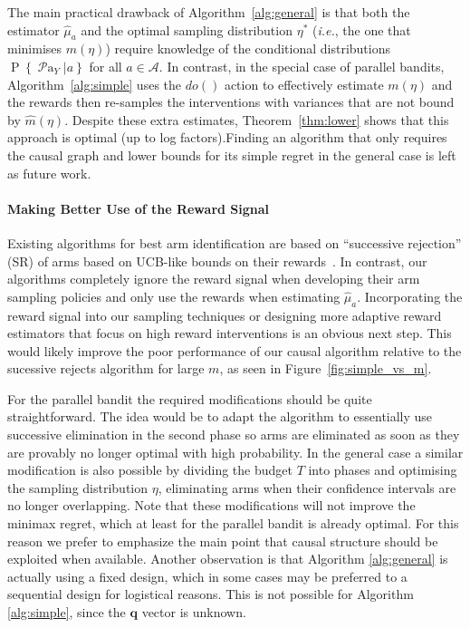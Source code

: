 \documentclass[11pt,a4paper,oneside]{book}
\newcommand{\Pn}[2]{\operatorname{P}\left\{#2|#1\right\}}
\newcommand{\calA}{\mathcal A}
\newcommand{\ie}{\textit{i.e.}}
\newcommand{\parents}[1]{\operatorname{\mathcal{P}a}_{#1}}
\renewcommand{\vec}[1]{\boldsymbol{#1}}
\begin{document}
The main practical drawback of Algorithm~\ref{alg:general} is that both the estimator $\hat{\mu}_a$ and the optimal sampling distribution $\eta^*$ (\ie, the one that minimises $m(\eta)$) require knowledge of the conditional distributions $\Pn{a}{\parents{Y}}$ for all $a \in \calA$. In contrast, in the special case of parallel bandits, Algorithm~\ref{alg:simple} uses the $do()$ action to effectively estimate $m(\eta)$ and the rewards then re-samples the interventions with variances that are not bound by $\hat{m}(\eta)$.
Despite these extra estimates, Theorem~\ref{thm:lower} shows that this approach is optimal (up to log factors).Finding an algorithm that only requires the causal graph and lower bounds for its simple regret in the general case is left as future work.


\paragraph{Making Better Use of the Reward Signal}
Existing algorithms for best arm identification are based on ``successive rejection'' (SR) of arms based on UCB-like bounds on their rewards~\citep{Even-Dar2002}. In contrast, our algorithms completely ignore the reward signal when developing their arm sampling policies and only use the rewards when estimating $\hat{\mu}_a$. Incorporating the reward signal into our sampling techniques or designing more adaptive reward estimators that focus on high reward interventions is an obvious next step. This would likely improve the poor performance of our causal algorithm relative to the sucessive rejects algorithm for large $m$, as seen in Figure~\ref{fig:simple_vs_m}.

For the parallel bandit the required modifications should be quite straightforward. The idea would be to adapt the algorithm to essentially use successive elimination in the second phase so arms are eliminated as soon as they are provably no longer optimal with high probability. In the general case a similar modification is also possible by dividing the budget $T$ into phases and optimising the sampling distribution $\eta$, eliminating arms when their confidence intervals are no longer overlapping. Note that these modifications will not improve the minimax regret, which at least for the parallel bandit is already optimal. For this reason we prefer to emphasize the main point that causal structure should be exploited when available. Another observation is that Algorithm \ref{alg:general} is actually using a fixed design, which in some cases may be preferred to a sequential design for logistical reasons. This is not possible for Algorithm \ref{alg:simple}, since the $\vec{q}$ vector is unknown.
\end{document}
